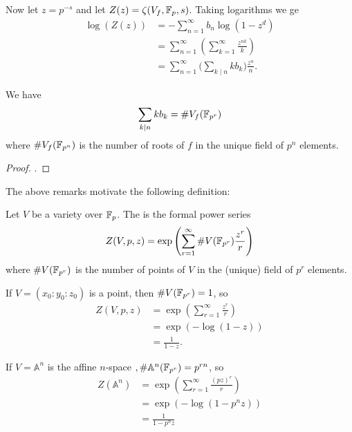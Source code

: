 \documentclass[12pt, a4paper]{amsart}
\begin{document}
Now let $z = p^{-s}$ and let $Z(z) = \zeta(V_f, \mathbb{F}_p, s)$. Taking logarithms
we ge
\begin{equation*}
  \begin{split}
    \log (Z(z)) &= - \sum\limits_{n=1}^\infty b_n \log(1-z^d) \\
    &= \sum\limits_{n=1}^\infty \left( \sum\limits_{k=1}^\infty \frac{z^{nk}}{k} \right) \\
    &= \sum\limits_{n=1}^\infty \big( \sum\limits_{k \mid n} kb_k \big) \frac{z^n}{n} .
  \end{split}
\end{equation*}

\begin{prop}
  We have
  \[\sum\limits_{k \mid n} kb_k = \# V_f(\mathbb{F}_{p^r})\]
  where $\# V_f(\mathbb{F}_{p^n})$ is the number of roots of $f$ in the unique field of
  $p^n$ elements.
\end{prop}
\begin{proof}
  \cite[See][Proposition VII-3.5, page 232]{lorenzini}.
\end{proof}

The above remarks motivate the following definition:

\begin{defn}
  Let $V$ be a variety over $\mathbb{F}_p$.
  The  is the formal power series
  \begin{equation} \label{zeta_defn}
    Z(V, p, z) = \exp \left( \sum\limits_{r=1}^{\infty} \# V(\mathbb{F}_{p^r}) \frac{z^r}{r} \right)
  \end{equation}
  where $\# V(\mathbb{F}_{p^r})$ is the number of points of $V$ in the (unique) field
  of $p^r$ elements.
\end{defn}

\begin{example}[Point]
  If $V = (x_0:y_0:z_0)$ is a point, then $\#V(\mathbb{F}_{p^r}) = 1$, so
  \begin{equation*}
    \begin{split}
      Z(V,p,z) &= \exp \left( \sum\limits_{r=1}^{\infty} \frac{z^r}{r} \right) \\
               &= \exp (-\log (1-z)) \\
               &= \frac{1}{1-z}.
    \end{split}
  \end{equation*}
             
\end{example}

\begin{example}
  If $V = \mathbb{A}^n$ is the affine
  $n$-space $, \#\mathbb{A}^n(\mathbb{F}_{p^r}) = p^{rn}$, so
  \begin{equation*}
    \begin{split}
      Z(\mathbb{A}^n) &= \exp \left(  \sum\limits_{r=1}^\infty \frac{(pz)^r}{r} \right) \\
      &= \exp ( - \log (1-p^nz) ) \\
      &= \frac{1}{1-p^nz}
    \end{split}
  \end{equation*}
\end{example}
\end{document}
